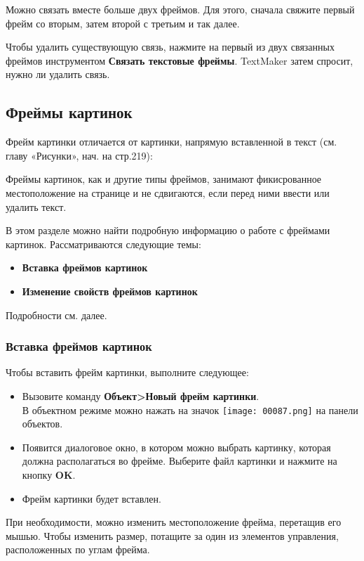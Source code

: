 ﻿\documentclass[a4paper,10pt]{article}
\begin{document}
Можно связать вместе больше двух фреймов. Для этого, сначала свяжите первый фрейм со вторым, затем второй с третьим и так далее.

Чтобы удалить существующую связь, нажмите на первый из двух связанных фреймов инструментом \textbf{Связать текстовые фреймы}. TextMaker затем спросит, нужно ли удалить связь.

\subsection{Фреймы картинок}
Фрейм картинки отличается от картинки, напрямую вставленной в текст (см. главу «Рисунки», нач. на стр.219):

Фреймы картинок, как и другие типы фреймов, занимают фикисрованное местоположение на странице и не сдвигаются, если перед ними ввести или удалить текст.

В этом разделе можно  найти подробную информацию о работе с фреймами картинок. Рассматриваются следующие темы:

\begin{itemize}
 \item \textbf{Вставка фреймов картинок}
 \item \textbf{Изменение свойств фреймов картинок}
\end{itemize}

Подробности см. далее.

\subsubsection{Вставка фреймов картинок}
Чтобы вставить фрейм картинки, выполните следующее:
\begin{itemize}
 \item Вызовите команду \textbf{Объект>Новый фрейм картинки}.\\
 В объектном режиме можно нажать на значок \texttt{[image: 00087.png]} на панели объектов.
 \item Появится диалоговое окно, в котором можно выбрать картинку, которая должна располагаться во фрейме. Выберите файл картинки и нажмите на кнопку \textbf{OK}.
 \item Фрейм картинки будет вставлен.
\end{itemize}

При необходимости, можно изменить местоположение фрейма, перетащив его мышью. Чтобы изменить размер, потащите за один из элементов управления, расположенных по углам фрейма.
\end{document}
